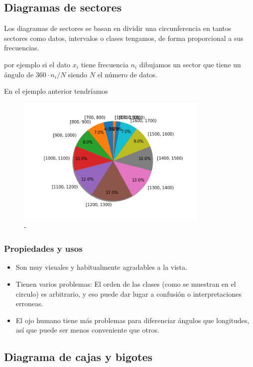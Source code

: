 \documentclass[]{article}
\providecommand{\tightlist}{%
  \setlength{\itemsep}{0pt}\setlength{\parskip}{0pt}}
\theoremstyle{plain}
\theoremstyle{definition}
\theoremstyle{definition} %
\begin{document}
\hypertarget{diagramas-de-sectores}{%
\subsection{Diagramas de sectores}\label{diagramas-de-sectores}}

Los diagramas de sectores se basan en dividir una circunferencia en
tantos sectores como datos, intervalos o clases tengamos, de forma
proporcional a sus frecuencias.

por ejemplo si el dato \(x_i\) tiene frecuencia \(n_i\) dibujamos un
sector que tiene un ángulo de \(360\cdot n_i / N\) siendo \(N\) el
número de datos.

En el ejemplo anterior tendríamos

\begin{figure}
\centering
\includegraphics[width=3.64583in,height=\textheight]{img/sectores.png}
\caption{-}
\end{figure}

\hypertarget{propiedades-y-usos-1}{%
\subsubsection{Propiedades y usos}\label{propiedades-y-usos-1}}

\begin{itemize}
\tightlist
\item
  Son muy visuales y habitualmente agradables a la vista.
\item
  Tienen varios problemas: El orden de las clases (como se muestran en
  el circulo) es arbitrario, y eso puede dar lugar a confusión o
  interpretaciones erroneas.
\item
  El ojo humano tiene más problemas para diferenciar ángulos que
  longitudes, así que puede ser menos conveniente que otros.
\end{itemize}

\hypertarget{diagrama-de-cajas-y-bigotes}{%
\subsection{Diagrama de cajas y
bigotes}\label{diagrama-de-cajas-y-bigotes}}
\end{document}
